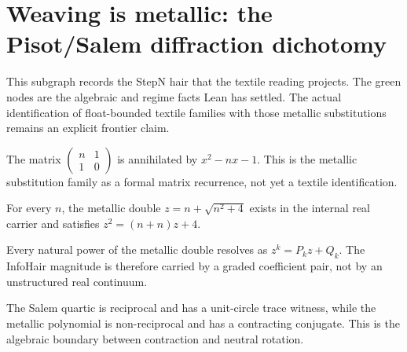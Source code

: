 \section{Weaving is metallic: the Pisot/Salem diffraction dichotomy}

This subgraph records the StepN hair that the textile reading projects.  The
green nodes are the algebraic and regime facts Lean has settled.  The actual
identification of float-bounded textile families with those metallic
substitutions remains an explicit frontier claim.

\begin{theorem}\label{thm:metallic-family-cayley-hamilton}\leanok{}
The matrix \(\begin{pmatrix}n&1\\1&0\end{pmatrix}\) is annihilated by
\(x^2-nx-1\).  This is the metallic substitution family as a formal
matrix recurrence, not yet a textile identification.
\end{theorem}

\begin{theorem}\label{thm:metallic-mean-real}\leanok{}
For every \(n\), the metallic double \(z=n+\sqrt{n^2+4}\) exists in the
internal real carrier and satisfies \(z^2=(n+n)z+4\).
\end{theorem}

\begin{theorem}\label{thm:metallic-power-lens}\leanok{}
Every natural power of the metallic double resolves as \(z^k=P_kz+Q_k\).
The InfoHair magnitude is therefore carried by a graded coefficient pair,
not by an unstructured real continuum.
\end{theorem}

\begin{theorem}\label{thm:salem-pisot-algebraic-split}\leanok{}
The Salem quartic is reciprocal and has a unit-circle trace witness, while
the metallic polynomial is non-reciprocal and has a contracting conjugate.
This is the algebraic boundary between contraction and neutral rotation.
\end{theorem}

